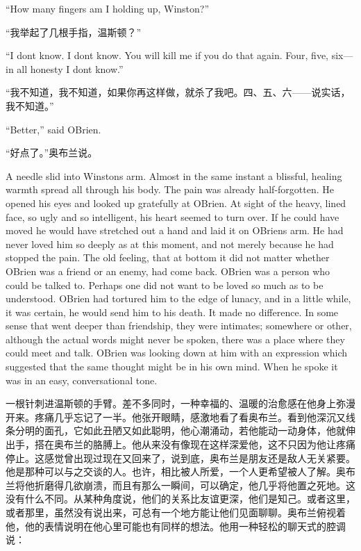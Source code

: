 \begin{paracol}{2}
\switchcolumn*

``How many fingers am I holding up, Winston?''

\switchcolumn

``我举起了几根手指，温斯顿？''

\switchcolumn*

``I don\textquotesingle t know. I don\textquotesingle t know. You will
kill me if you do that again. Four, five, six---in all honesty I
don\textquotesingle t know.''

\switchcolumn

``我不知道，我不知道，如果你再这样做，就杀了我吧。四、五、六——说实话，我不知道。''

\switchcolumn*

``Better,'' said O\textquotesingle Brien.

\switchcolumn

``好点了。''奥布兰说。

\switchcolumn*

A needle slid into Winston\textquotesingle s arm. Almost in the same
instant a blissful, healing warmth spread all through his body. The pain
was already half-forgotten. He opened his eyes and looked up gratefully
at O\textquotesingle Brien. At sight of the heavy, lined face, so ugly
and so intelligent, his heart seemed to turn over. If he could have
moved he would have stretched out a hand and laid it on
O\textquotesingle Brien\textquotesingle s arm. He had never loved him so
deeply as at this moment, and not merely because he had stopped the
pain. The old feeling, that at bottom it did not matter whether
O\textquotesingle Brien was a friend or an enemy, had come back.
O\textquotesingle Brien was a person who could be talked to. Perhaps one
did not want to be loved so much as to be understood.
O\textquotesingle Brien had tortured him to the edge of lunacy, and in a
little while, it was certain, he would send him to his death. It made no
difference. In some sense that went deeper than friendship, they were
intimates; somewhere or other, although the actual words might never be
spoken, there was a place where they could meet and talk.
O\textquotesingle Brien was looking down at him with an expression which
suggested that the same thought might be in his own mind. When he spoke
it was in an easy, conversational tone.

\switchcolumn

一根针刺进温斯顿的手臂。差不多同时，一种幸福的、温暖的治愈感在他身上弥漫开来。疼痛几乎忘记了一半。他张开眼睛，感激地看了看奥布兰。看到他深沉又线条分明的面孔，它如此丑陋又如此聪明，他心潮涌动，若他能动一动身体，他就伸出手，搭在奥布兰的胳膊上。他从来没有像现在这样深爱他，这不只因为他让疼痛停止。这感觉曾出现过现在又回来了，说到底，奥布兰是朋友还是敌人无关紧要。他是那种可以与之交谈的人。也许，相比被人所爱，一个人更希望被人了解。奥布兰将他折磨得几欲崩溃，而且有那么一瞬间，可以确定，他几乎将他置之死地。这没有什么不同。从某种角度说，他们的关系比友谊更深，他们是知己。或者这里，或者那里，虽然没有说出来，可总有一个地方能让他们见面聊聊。奥布兰俯视着他，他的表情说明在他心里可能也有同样的想法。他用一种轻松的聊天式的腔调说：


\end{paracol}
